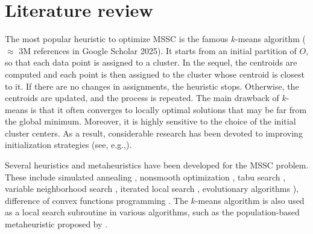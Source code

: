 \section{Literature review}
\label{sec:lit}

The most popular heuristic to optimize MSSC is the famous $k$-means algorithm \citep{macqueen1967some, lloyd1982least} ($\approx$ 3M references in Google Scholar 2025). It starts from an initial partition of $O$, so that each data point is assigned to a cluster. In the sequel, the centroids are computed and each point is then assigned to the cluster whose centroid is closest to it. If there are no changes in assignments, the heuristic stops. Otherwise, the
centroids are updated, and the process is repeated. The main drawback of $k$-means is that it often converges to locally optimal solutions that may be far from the global minimum. Moreover, it is highly sensitive to the choice of the initial cluster centers. As a result, considerable research has been devoted to improving initialization strategies (see, e.g.,\cite{arthur2006k,improvedkmeans2018,franti2019much}). 

Several heuristics and metaheuristics have been developed for the MSSC problem. These include simulated annealing \citep{lee2021simulated}, nonsmooth optimization \citep{bagirov2006new, BAGIROV201612}, tabu search \citep{ALSULTAN19951443}, variable neighborhood search \citep{HANSEN2001405,Orlov2018, carrizosa2013variable}, iterated local search \citep{likas2003global}, evolutionary algorithms \citep{MAULIK20001455,SARKAR1997975}), difference of convex functions programming \citep{tao2014new,BAGIROV201612,KARMITSA2017367,KARMITSA2018245}. The \(k\)-means algorithm is also used as a local search subroutine in various algorithms, such as the population-based metaheuristic proposed by \cite{gribel2019hg}.

